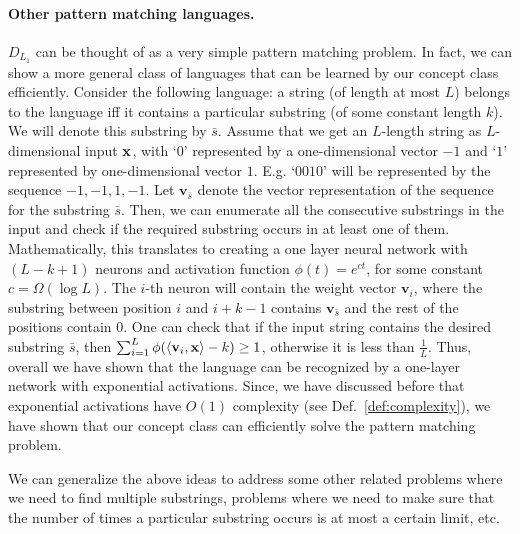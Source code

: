 \paragraph{Other pattern matching languages.} $D_{L_1}$ can be thought of as a very simple pattern matching problem.  In fact, we can show a more general class of languages that can be learned by our concept class efficiently. Consider the following language: a string (of length at most $L$) belongs to the language iff it contains a particular substring (of some constant length $k$). We will denote this substring by $\bar{s}$. Assume that we get an $L$-length string as $L$-dimensional input $\mathbf{x}$, with `$0$' represented by a one-dimensional vector $-1$ and `$1$' represented by one-dimensional vector $1$. E.g. `$0010$' will be represented by the sequence $-1,-1,1,-1$. Let $\mathbf{v}_{\bar{s}}$ denote the vector representation of the sequence for the substring $\bar{s}$. Then, we can enumerate all the consecutive substrings in the input and check if the required substring occurs in at least one of them. Mathematically, this translates to creating a one layer neural network with $(L-k+1)$ neurons and activation function $\phi(t) = e^{ct}$, for some constant $c = \Omega(\log L)$. The $i$-th neuron will contain the weight vector $\mathbf{v}_i$, where the substring between position $i$ and $i+k-1$ contains $\mathbf{v}_{\bar{s}}$ and the rest of the positions contain $0$. One can check that if the input string contains the desired substring $\bar{s}$, then
$\sum_{i=1}^{L} \phi(\langle \mathbf{v}_i, \mathbf{x}\rangle - k) \ge 1$, otherwise it is less than $\frac{1}{L}$. Thus, overall we have shown that the language can be recognized by a one-layer network with exponential activations. Since, we have discussed before that exponential activations have $O(1)$ complexity (see Def.~\ref{def:complexity}), we have shown that our concept class can efficiently solve the pattern matching problem.

We can generalize the above ideas to address some other related problems where we need to find multiple substrings, problems where we need to make sure that the number of times a particular substring occurs is at most a certain limit, etc.


